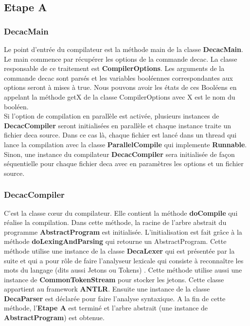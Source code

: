 \documentclass[12pt, a4paper, one side]{article}
\begin{document}
    \subsection{Etape A}

    \subsubsection{DecacMain}
    Le point d'entrée du compilateur est la méthode main de la classe \textbf {DecacMain}. Le main commence par récupérer les options de la commande decac. La classe responsable de ce traitement est \textbf{CompilerOptions}. Les arguments de la commande decac sont parsés et les variables booléennes correspondantes aux options seront à mises à true. Nous pouvons avoir les états de ces Booléens en appelant la méthode getX de la classe CompilerOptions avec X est le nom du booléen.
    \\
    Si l'option de compilation en parallèle est activée, plusieurs instances de \textbf{DecacCompiler} seront initialisées en parallèle et chaque instance traite un fichier deca source. Dans ce cas là, chaque fichier est lancé
    dans un thread qui lance la compilation avec la classe
    \textbf{ParallelCompile} qui implemente \textbf{Runnable}.
    Sinon, une instance du compilateur \textbf{DecacCompiler} sera initialisée de façon séquentielle pour chaque fichier deca avec en paramètres les options et un fichier source.

    \subsubsection{DecacCompiler} C'est la classe cœur du compilateur. Elle
    contient la méthode \textbf{doCompile} qui réalise la compilation. Dans
    cette méthode, la racine de l'arbre abstrait du programme
    \textbf{AbstractProgram} est initialisée. L'initialisation est fait grâce à
    la méthode \textbf{doLexingAndParsing} qui retourne un AbstractProgram.
    Cette méthode utilise une instance de la classe \textbf{DecaLexer} qui est
    présentée par la suite et qui a pour rôle de faire l'analyseur lexicale qui
    consiste à reconnaître les mots du langage (dits aussi Jetons ou Tokens) .
    Cette méthode utilise aussi une instance de \textbf{CommonTokenStream} pour
    stocker les
    jetons. Cette classe appartient au framework \textbf{ANTLR}. Ensuite une instance de la classe \textbf{DecaParser} est déclarée pour faire l'analyse syntaxique. A la fin de cette méthode, l'\textbf{Etape A} est terminé et l'arbre abstrait (une instance de \textbf{AbstractProgram}) est obtenue.
\end{document}
